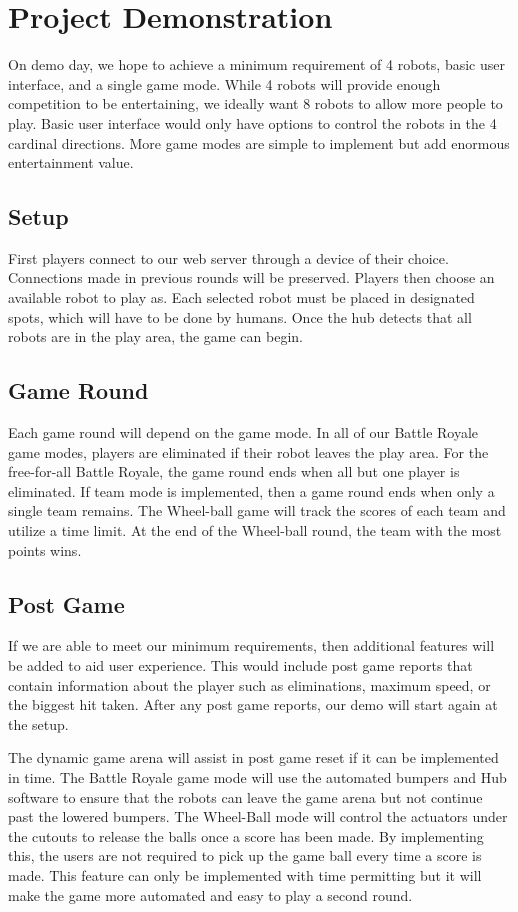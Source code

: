 \documentclass[11pt]{ieeeconf}
\begin{document}
\section{Project Demonstration}

On demo day, we hope to achieve a minimum requirement of 4 robots, basic user interface, and a single game mode. While 4 robots will provide enough competition to be entertaining, we ideally want 8 robots to allow more people to play. Basic user interface would only have options to control the robots in the 4 cardinal directions. More game modes are simple to implement but add enormous entertainment value.

\subsection{Setup}
First players connect to our web server through a device of their choice. Connections made in previous rounds will be preserved. Players then choose an available robot to play as. Each selected robot must be placed in designated spots, which will have to be done by humans. Once the hub detects that all robots are in the play area, the game can begin. 

\subsection{Game Round}
Each game round will depend on the game mode. In all of our Battle Royale game modes, players are eliminated if their robot leaves the play area. For the free-for-all Battle Royale, the game round ends when all but one player is eliminated. If team mode is implemented, then a game round ends when only a single team remains. The Wheel-ball game will track the scores of each team and utilize a time limit. At the end of the Wheel-ball round, the team with the most points wins.  

\subsection{Post Game}
If we are able to meet our minimum requirements, then additional features will be added to aid user experience. This would include post game reports that contain information about the player such as eliminations, maximum speed, or the biggest hit taken. After any post game reports, our demo will start again at the setup.

The dynamic game arena will assist in post game reset if it can be implemented in time. The Battle Royale game mode will use the automated bumpers and Hub software to ensure that the robots can leave the game arena but not continue past the lowered bumpers. The Wheel-Ball mode will control the actuators under the cutouts to release the balls once a score has been made. By implementing this, the users are not required to pick up the game ball every time a score is made. This feature can only be implemented with time permitting but it will make the game more automated and easy to play a second round. 
\end{document}
